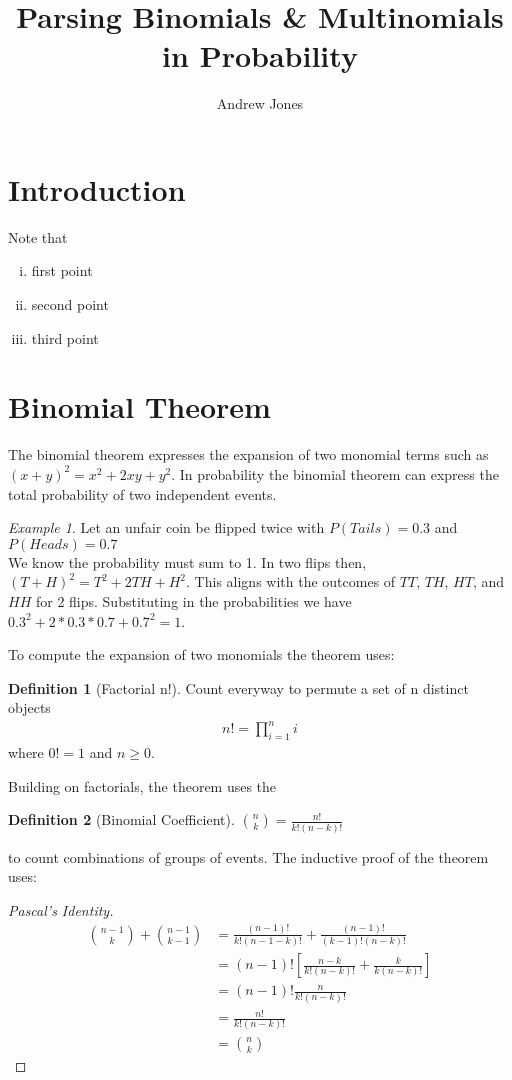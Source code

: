 \documentclass{article}
\title{Parsing Binomials \& Multinomials in Probability}
\author{Andrew Jones}\date{}
\theoremstyle{plain}
\theoremstyle{definition}
\newtheorem{definition}{Definition}
\theoremstyle{remark}
\newtheorem{example}{Example}
\begin{document}
\maketitle



\section*{Introduction}

Note that
\begin{enumerate}[i.,noitemsep]
	\item first point
	\item second point
	\item third point
\end{enumerate}




\section{Binomial Theorem}
The binomial theorem expresses the expansion of two monomial terms such as $(x + y)^2 = x^2 + 2xy + y^2$. In probability the binomial theorem can express the total probability of two independent events.
\begin{example}
  Let an unfair coin be flipped twice with $P(Tails) = 0.3$ and $P(Heads) = 0.7$ \\
  We know the probability must sum to 1. In two flips then, $(T + H)^2 = T^2 + 2TH + H^2$. This aligns with the outcomes of $TT$, $TH$, $HT$, and $HH$ for 2 flips. Substituting in the probabilities we have $0.3^2 + 2*0.3*0.7 + 0.7^2 = 1$.
\end{example}
To compute the expansion of two monomials the theorem uses:
\begin{definition}[Factorial n!]
  Count everyway to permute a set of n distinct objects
  \begin{align*}
    n! = {\displaystyle\prod_{i=1}^{n}i}
  \end{align*}
  where $0! = 1$ and $n \geq 0$.
\end{definition}
Building on factorials, the theorem uses the
\begin{definition}[Binomial Coefficient]
	$\binom{n}{k} = \frac{n!}{k!(n-k)!}$
\end{definition}
to count combinations of groups of events.
The inductive proof of the theorem uses:
\begin{proof}[Pascal's Identity]
  \begin{align*}
    \binom{n - 1}{k} + \binom{n - 1}{k - 1} &= \frac{(n-1)!}{k!(n - 1 - k)!} + \frac{(n - 1)!}{(k-1)!(n-k)!} \\
    &= (n - 1)![\frac{n-k}{k!(n-k)!} + \frac{k}{k(n-k)!}] \\
    &= (n - 1)!\frac{n}{k!(n-k)!} \\
    &= \frac{n!}{k!(n - k)!} \\
    &= \binom{n}{k}
  \end{align*}
\end{proof}
\end{document}
